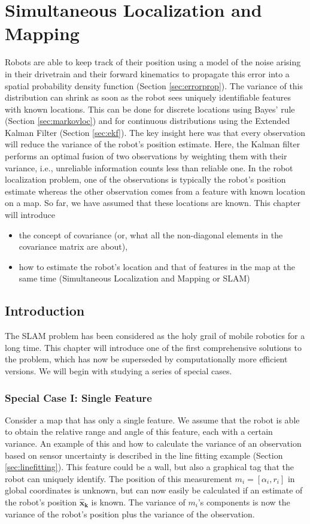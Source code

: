 \chapter{Simultaneous Localization and Mapping}\label{chap:slam}
Robots are able to keep track of their position using a model of the noise arising in their drivetrain and their forward kinematics to propagate this error into a spatial probability density function (Section \ref{sec:errorprop}). The variance of this distribution can shrink as soon as the robot sees uniquely identifiable features with known locations. This can be done for discrete locations using Bayes' rule (Section \ref{sec:markovloc}) and for continuous distributions using the Extended Kalman Filter (Section \ref{sec:ekf}). The key insight here was that every observation will reduce the variance of the robot's position estimate. Here, the Kalman filter performs an optimal fusion of two observations by weighting them with their variance, i.e., unreliable information counts less than reliable one. In the robot localization problem, one of the observations is typically the robot's position estimate whereas the other observation comes from a feature with known location on a map. So far, we have assumed that these locations are known. This chapter will introduce

\begin{itemize}
\item the concept of covariance (or, what all the non-diagonal elements in the covariance matrix are about),
\item how to estimate the robot's location and that of features in the map at the same time (Simultaneous Localization and Mapping or SLAM)
\end{itemize}

\section{Introduction}
The SLAM problem has been considered as the holy grail of mobile robotics for a long time. This chapter will introduce one of the first comprehensive solutions to the problem, which has now be superseded by computationally more efficient versions. We will begin with studying a series of special cases.

\subsection{Special Case I: Single Feature}
Consider a map that has only a single feature. We assume that the robot is able to obtain the relative range and angle of this feature, each with a certain variance. An example of this and how to calculate the variance of an observation based on sensor uncertainty is described in the line fitting example (Section \ref{sec:linefitting}). This feature could be a wall, but also a graphical tag that the robot can uniquely identify. The position of this measurement $m_i=[\alpha_i,r_i]$  in global coordinates is unknown, but can now easily be calculated if an estimate of the robot's position $\boldsymbol{\hat{x}_k}$ is known.  The variance of $ m_i$'s components is now the variance of the robot's position plus the variance of the observation.

